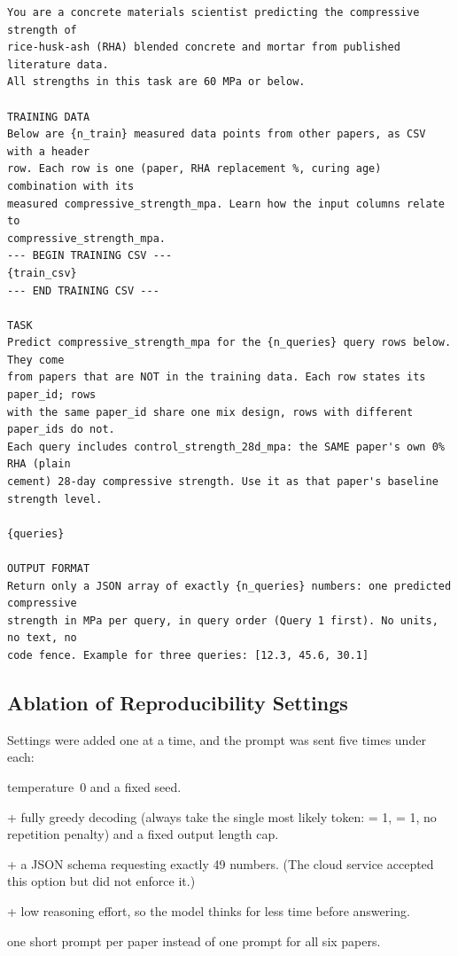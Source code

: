 \documentclass[11pt]{article}
\begin{document}
\begin{center}
\begin{minipage}{0.92\linewidth}
\footnotesize
\begin{verbatim}
You are a concrete materials scientist predicting the compressive strength of
rice-husk-ash (RHA) blended concrete and mortar from published literature data.
All strengths in this task are 60 MPa or below.

TRAINING DATA
Below are {n_train} measured data points from other papers, as CSV with a header
row. Each row is one (paper, RHA replacement %, curing age) combination with its
measured compressive_strength_mpa. Learn how the input columns relate to
compressive_strength_mpa.
--- BEGIN TRAINING CSV ---
{train_csv}
--- END TRAINING CSV ---

TASK
Predict compressive_strength_mpa for the {n_queries} query rows below. They come
from papers that are NOT in the training data. Each row states its paper_id; rows
with the same paper_id share one mix design, rows with different paper_ids do not.
Each query includes control_strength_28d_mpa: the SAME paper's own 0% RHA (plain
cement) 28-day compressive strength. Use it as that paper's baseline strength level.

{queries}

OUTPUT FORMAT
Return only a JSON array of exactly {n_queries} numbers: one predicted compressive
strength in MPa per query, in query order (Query 1 first). No units, no text, no
code fence. Example for three queries: [12.3, 45.6, 30.1]
\end{verbatim}
\end{minipage}
\end{center}

\subsection{Ablation of Reproducibility Settings}
\label{sec:p3-repro}
Settings were added one at a time, and the prompt was sent five times under each:
\begin{description}\itemsep1pt
  \item[S0] temperature~0 and a fixed seed.
  \item[S1] + fully greedy decoding (always take the single most likely token:
         = 1,  = 1, no repetition penalty) and a fixed output
        length cap.
  \item[S2] + a JSON schema requesting exactly 49 numbers. (The cloud service accepted
        this option but did not enforce it.)
  \item[S3] + low reasoning effort, so the model thinks for less time before answering.
  \item[S4] one short prompt per paper instead of one prompt for all six papers.
\end{description}
\end{document}
